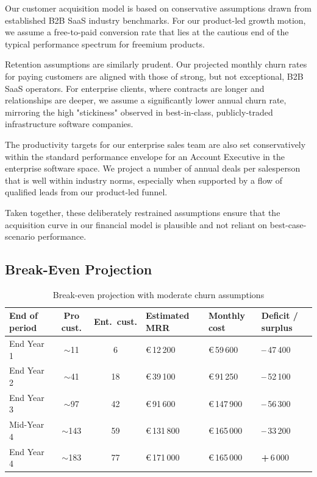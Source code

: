 \documentclass[11pt, a4paper, oneside]{article}
\begin{document}
Our customer acquisition model is based on conservative assumptions drawn from established B2B SaaS industry benchmarks. For our product-led growth motion, we assume a free-to-paid conversion rate that lies at the cautious end of the typical performance spectrum for freemium products.

Retention assumptions are similarly prudent. Our projected monthly churn rates for paying customers are aligned with those of strong, but not exceptional, B2B SaaS operators. For enterprise clients, where contracts are longer and relationships are deeper, we assume a significantly lower annual churn rate, mirroring the high "stickiness" observed in best-in-class, publicly-traded infrastructure software companies.

The productivity targets for our enterprise sales team are also set conservatively within the standard performance envelope for an Account Executive in the enterprise software space. We project a number of annual deals per salesperson that is well within industry norms, especially when supported by a flow of qualified leads from our product-led funnel.

Taken together, these deliberately restrained assumptions ensure that the acquisition curve in our financial model is plausible and not reliant on best-case-scenario performance.


\subsection{Break-Even Projection}

\begin{table}[H]
\centering
\caption{Break-even projection with moderate churn assumptions}
\label{tab:break_even_moderate_churn}
\begin{tabularx}{\textwidth}{@{}l c c >{\raggedleft\arraybackslash}X
                                    >{\raggedleft\arraybackslash}X
                                    >{\raggedleft\arraybackslash}X@{}}
\toprule
\textbf{End of period} &
\textbf{Pro cust.} &
\textbf{Ent.\ cust.} &
\textbf{Estimated MRR} &
\textbf{Monthly cost} &
\textbf{Deficit / surplus} \\
\midrule
End Year 1  & $\sim$11  & 6  & \euro{}\,12\,200  & \euro{}\,59\,600  & \textbf{–}\,47\,400 \\
End Year 2  & $\sim$41  & 18 & \euro{}\,39\,100  & \euro{}\,91\,250  & \textbf{–}\,52\,100 \\
End Year 3  & $\sim$97  & 42 & \euro{}\,91\,600  & \euro{}\,147\,900 & \textbf{–}\,56\,300 \\
Mid-Year 4  & $\sim$143 & 59 & \euro{}\,131\,800 & \euro{}\,165\,000 & \textbf{–}\,33\,200 \\
End Year 4  & $\sim$183 & 77 & \euro{}\,171\,000 & \euro{}\,165\,000 & \textbf{+}\,6\,000  \\
\bottomrule
\end{tabularx}
\end{table}
\end{document}
